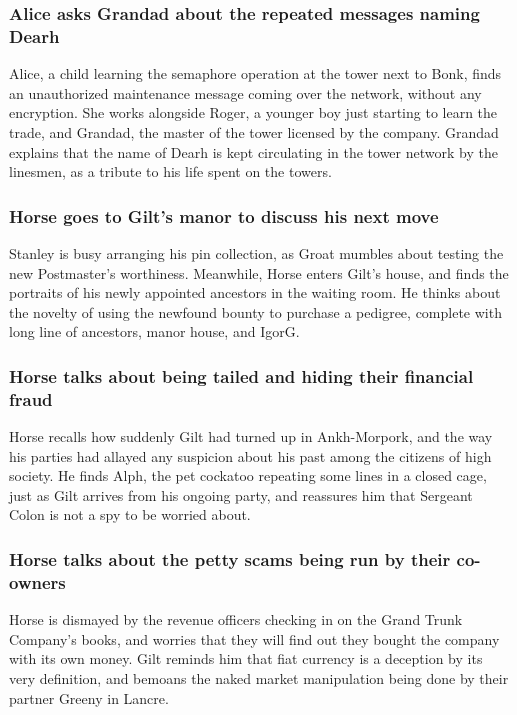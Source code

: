 \subsubsection{\Gls{Alice} asks \Gls{Grandad} about the repeated messages naming \Gls{Dearh}}
\Gls{Alice}, a child learning the semaphore operation at the tower next to Bonk, finds an
unauthorized maintenance message coming over the network, without any encryption. She works
alongside \Gls{Roger}, a younger boy just starting to learn the trade, and \Gls{Grandad}, the
master of the tower licensed by the company. \Gls{Grandad} explains that the name of \Gls{Dearh}
is kept circulating in the tower network by the linesmen, as a tribute to his life spent on the
towers.

\subsubsection{\Gls{Horse} goes to \Gls{Gilt}'s manor to discuss his next move}
\Gls{Stanley} is busy arranging his pin collection, as \Gls{Groat} mumbles about testing the
new Postmaster's worthiness. Meanwhile, \Gls{Horse} enters \Gls{Gilt}'s house, and finds the
portraits of his newly appointed ancestors in the waiting room. He thinks about the novelty of using
the newfound bounty to purchase a pedigree, complete with long line of ancestors, manor house, and
\Gls{IgorG}.

\subsubsection{\Gls{Horse} talks about being tailed and hiding their financial fraud}
\Gls{Horse} recalls how suddenly \Gls{Gilt} had turned up in Ankh-Morpork, and the way his parties
had allayed any suspicion about his past among the citizens of high society. He finds \Gls{Alph},
the pet cockatoo repeating some lines in a closed cage, just as \Gls{Gilt} arrives from his ongoing
party, and reassures him that Sergeant \Gls{Colon} is not a spy to be worried about.

\subsubsection{\Gls{Horse} talks about the petty scams being run by their co-owners}
\Gls{Horse} is dismayed by the revenue officers checking in on the Grand Trunk Company's books,
and worries that they will find out they bought the company with its own money. \Gls{Gilt} reminds
him that fiat currency is a deception by its very definition, and bemoans the naked market
manipulation being done by their partner \Gls{Greeny} in Lancre.

